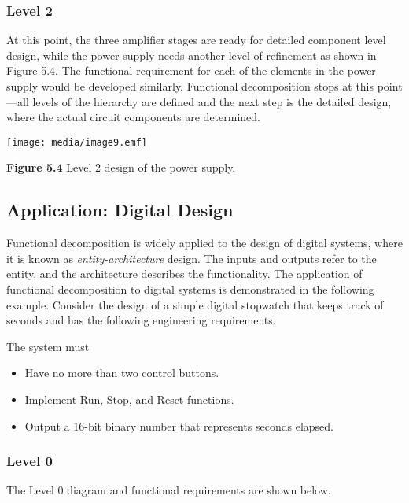 \subsubsection*{Level 2}\label{level-2}

At this point, the three amplifier stages are ready for detailed
component level design, while the power supply needs another level of
refinement as shown in Figure 5.4. The functional requirement for each
of the elements in the power supply would be developed similarly.
Functional decomposition stops at this point---all levels of the
hierarchy are defined and the next step is the detailed design, where
the actual circuit components are determined.

\texttt{[image: media/image9.emf]}

\textbf{Figure 5.4} Level 2 design of the power supply.

\subsection{Application: Digital
Design}\label{application-digital-design}

Functional decomposition is widely applied to the design of digital
systems, where it is known as \emph{entity-architecture} design. The
inputs and outputs refer to the entity, and the architecture describes
the functionality. The application of functional decomposition to
digital systems is demonstrated in the following example. Consider the
design of a simple digital stopwatch that keeps track of seconds and has
the following engineering requirements.

The system must

\begin{itemize}
\item
  Have no more than two control buttons.
\item
  Implement Run, Stop, and Reset functions.
\item
  Output a 16-bit binary number that represents seconds elapsed.
\end{itemize}

\subsubsection*{Level 0}\label{level-0-1}

The Level 0 diagram and functional requirements are shown below.

